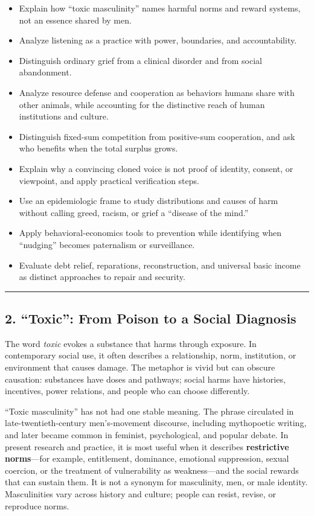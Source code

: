 \documentclass[
  11pt,
  letterpaper,
]{article}
\providecommand{\tightlist}{%
  \setlength{\itemsep}{0pt}\setlength{\parskip}{0pt}}
\begin{document}
\begin{itemize}
\tightlist
\item
  Explain how ``toxic masculinity'' names harmful norms and reward
  systems, not an essence shared by men.
\item
  Analyze listening as a practice with power, boundaries, and
  accountability.
\item
  Distinguish ordinary grief from a clinical disorder and from social
  abandonment.
\item
  Analyze resource defense and cooperation as behaviors humans share
  with other animals, while accounting for the distinctive reach of
  human institutions and culture.
\item
  Distinguish fixed-sum competition from positive-sum cooperation, and
  ask who benefits when the total surplus grows.
\item
  Explain why a convincing cloned voice is not proof of identity,
  consent, or viewpoint, and apply practical verification steps.
\item
  Use an epidemiologic frame to study distributions and causes of harm
  without calling greed, racism, or grief a ``disease of the mind.''
\item
  Apply behavioral-economics tools to prevention while identifying when
  ``nudging'' becomes paternalism or surveillance.
\item
  Evaluate debt relief, reparations, reconstruction, and universal basic
  income as distinct approaches to repair and security.
\end{itemize}

\begin{center}\rule{0.5\linewidth}{0.5pt}\end{center}

\subsection{2. ``Toxic'': From Poison to a Social
Diagnosis}\label{toxic-from-poison-to-a-social-diagnosis}

The word \emph{toxic} evokes a substance that harms through exposure. In
contemporary social use, it often describes a relationship, norm,
institution, or environment that causes damage. The metaphor is vivid
but can obscure causation: substances have doses and pathways; social
harms have histories, incentives, power relations, and people who can
choose differently.

``Toxic masculinity'' has not had one stable meaning. The phrase
circulated in late-twentieth-century men's-movement discourse, including
mythopoetic writing, and later became common in feminist, psychological,
and popular debate. In present research and practice, it is most useful
when it describes \textbf{restrictive norms}---for example, entitlement,
dominance, emotional suppression, sexual coercion, or the treatment of
vulnerability as weakness---and the social rewards that can sustain
them. It is not a synonym for masculinity, men, or male identity.
Masculinities vary across history and culture; people can resist,
revise, or reproduce norms.
\end{document}
